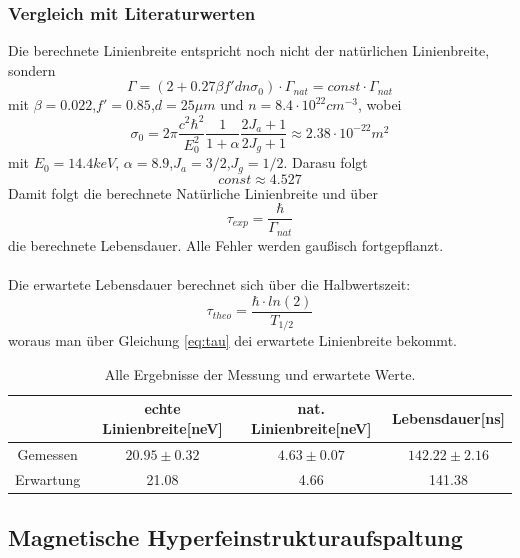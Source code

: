 \documentclass[12pt,a4paper]{article}
\begin{document}
\subsubsection{Vergleich mit Literaturwerten}
Die berechnete Linienbreite entspricht noch nicht der natürlichen Linienbreite, sondern
\begin{equation}
\Gamma = (2+0.27\beta f' d n \sigma_0) \cdot \Gamma_{nat} = const \cdot \Gamma_{nat}
\end{equation}
mit $\beta = 0.022$,$f' = 0.85$,$d = 25\mu m$ und $n=8.4\cdot 10^{22}cm^{-3}$, wobei 
\begin{equation}
\sigma_0 = 2 \pi \dfrac{c^2 \hbar^2}{E_0^2} \dfrac{1}{1+\alpha} \dfrac{2 J_a+1}{2 J_g+1} \approx 2.38\cdot 10^{-22} m^2
\end{equation}
mit $E_0 = 14.4keV$, $\alpha = 8.9$,$J_a = 3/2$,$J_g = 1/2$. Darasu folgt 
\begin{equation}
const \approx 4.527
\end{equation}
Damit folgt die berechnete Natürliche Linienbreite und über
\begin{equation}
\tau_{exp} = \dfrac{\hbar}{\Gamma_{nat}}
\label{eq:tau}
\end{equation}
die berechnete Lebensdauer. Alle Fehler werden gaußisch fortgepflanzt.\\
\\
Die erwartete Lebensdauer berechnet sich über die Halbwertszeit:
\begin{equation}
\tau_{theo} = \dfrac{\hbar\cdot ln(2)}{T_{1/2}}
\end{equation}
woraus man über Gleichung \ref{eq:tau} dei erwartete Linienbreite bekommt.

\begin{table}
\centering
\begin{tabular}{|c|c|c|c|}
\hline 
 & echte Linienbreite[neV] & nat. Linienbreite[neV] & Lebensdauer[ns]\\ 
\hline 
Gemessen & $20.95\pm 0.32$ & $4.63\pm 0.07$ & $142.22\pm2.16$\\ 
\hline 
Erwartung & 21.08 & 4.66 & 141.38\\ 
\hline 
\end{tabular} 
\label{tab:Ein_lit}
\caption{Alle Ergebnisse der Messung und erwartete Werte.}
\end{table}


\subsection{Magnetische Hyperfeinstrukturaufspaltung}
\end{document}

